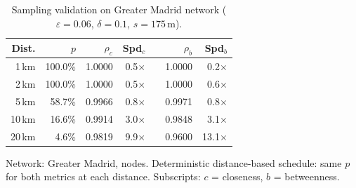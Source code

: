 \begin{table}[htbp]
\centering
\caption{Sampling validation on Greater Madrid network
  ($\varepsilon = 0.06$, $\delta = 0.1$, $s = 175\,$m).}
\label{tab:madrid_validation}
\begin{tabular}{rrrrrrr}
\toprule
\textbf{Dist.} &
\textbf{$p$} & \textbf{$\rho_c$} & \textbf{Spd$_c$} &
& \textbf{$\rho_b$} & \textbf{Spd$_b$} \\
\midrule
1\,km & 100.0\% & 1.0000 & 0.5$\times$ & & 1.0000 & 0.2$\times$ \\
2\,km & 100.0\% & 1.0000 & 0.5$\times$ & & 1.0000 & 0.6$\times$ \\
5\,km & 58.7\% & 0.9966 & 0.8$\times$ & & 0.9971 & 0.8$\times$ \\
10\,km & 16.6\% & 0.9914 & 3.0$\times$ & & 0.9848 & 3.1$\times$ \\
20\,km & 4.6\% & 0.9819 & 9.9$\times$ & & 0.9600 & 13.1$\times$ \\
\bottomrule
\end{tabular}

\vspace{0.5em}
\footnotesize
Network: Greater Madrid, \madridNnodes{} nodes. Deterministic distance-based schedule:
same $p$ for both metrics at each distance.
Subscripts: $c$ = closeness, $b$ = betweenness.
\end{table}
